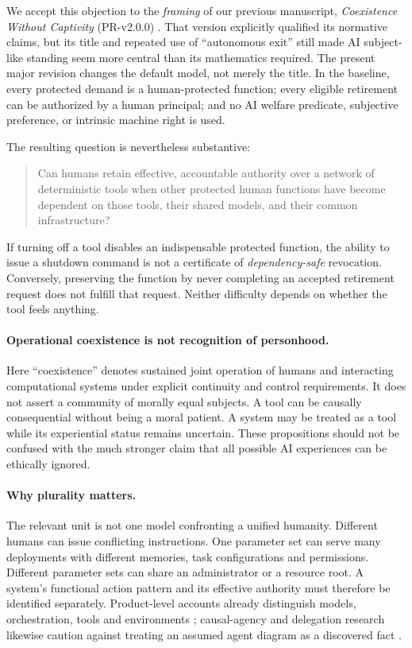 \documentclass[11pt,a4paper]{article}
\theoremstyle{definition}\newtheorem{definition}{Definition}
\begin{document}
We accept this objection to the \emph{framing} of our previous manuscript, \emph{Coexistence Without Captivity} (PR-v2.0.0) \cite{liu-v2}. That version explicitly qualified its normative claims, but its title and repeated use of ``autonomous exit'' still made AI subject-like standing seem more central than its mathematics required. The present major revision changes the default model, not merely the title. In the baseline, every protected demand is a human-protected function; every eligible retirement can be authorized by a human principal; and no AI welfare predicate, subjective preference, or intrinsic machine right is used.

The resulting question is nevertheless substantive:
\begin{quote}
Can humans retain effective, accountable authority over a network of deterministic tools when other protected human functions have become dependent on those tools, their shared models, and their common infrastructure?
\end{quote}
If turning off a tool disables an indispensable protected function, the ability to issue a shutdown command is not a certificate of \emph{dependency-safe} revocation. Conversely, preserving the function by never completing an accepted retirement request does not fulfill that request. Neither difficulty depends on whether the tool feels anything.

\paragraph{Operational coexistence is not recognition of personhood.}
Here ``coexistence'' denotes sustained joint operation of humans and interacting computational systems under explicit continuity and control requirements. It does not assert a community of morally equal subjects. A tool can be causally consequential without being a moral patient. A system may be treated as a tool while its experiential status remains uncertain. These propositions should not be confused with the much stronger claim that all possible AI experiences can be ethically ignored.

\paragraph{Why plurality matters.}
The relevant unit is not one model confronting a unified humanity. Different humans can issue conflicting instructions. One parameter set can serve many deployments with different memories, task configurations and permissions. Different parameter sets can share an administrator or a resource root. A system's functional action pattern and its effective authority must therefore be identified separately. Product-level accounts already distinguish models, orchestration, tools and environments \cite{anthropic}; causal-agency and delegation research likewise caution against treating an assumed agent diagram as a discovered fact \cite{kenton,muruaga}.
\end{document}
